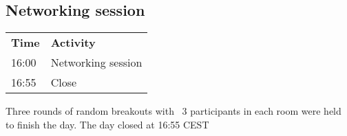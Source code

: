 \subsection{Networking session}

\begin{table}[!h]
    \centering
    \begin{tabular}{@{}|p{}|p{}|@{}}
    \rowcolor{Task32Blue2} \textbf{Time} & \textbf{Activity} \\
    16:00 & Networking session \\
    16:55 & Close \\
    \end{tabular}
    \label{tab:day1-networking}
\end{table}

Three rounds of random breakouts with ~3 participants in each room were held to finish the day. The day closed at 16:55 CEST